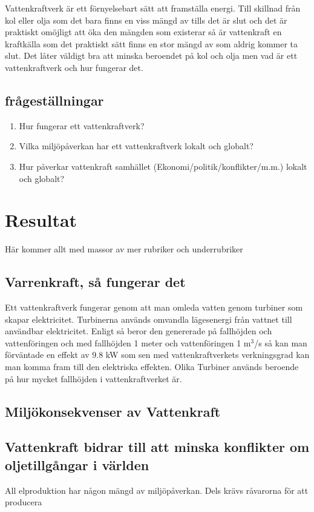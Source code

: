 \documentclass[11p]{article}
\begin{document}
Vattenkraftverk är ett förnyelsebart sätt att framställa energi.
 Till skillnad från kol eller olja som det bara finns en viss mängd av tills det är slut och det är praktiskt omöjligt att öka den mängden som existerar så är vattenkraft en kraftkälla som det praktiskt sätt finns en stor mängd av som aldrig kommer ta slut.
Det låter väldigt bra att minska beroendet på kol och olja men vad är ett vattenkraftverk och hur fungerar det.

 \subsection{frågeställningar}
 \begin{enumerate}
  \item Hur fungerar ett vattenkraftverk?
  \item Vilka miljöpåverkan har ett vattenkraftverk lokalt och globalt?
  \item Hur påverkar vattenkraft samhället (Ekonomi/politik/konflikter/m.m.) lokalt och globalt?
 \end{enumerate}

 \section{Resultat}
 Här kommer allt med massor av mer rubriker och underrubriker
 \subsection{Varrenkraft, så fungerar det}

 Ett vattenkraftverk fungerar genom att man omleda vatten genom turbiner som skapar elektricitet.
 Turbinerna används omvandla lägesenergi från vattnet till användbar elektricitet.
 Enligt \textcite{NE} så beror den genererade på fallhöjden och vattenföringen och med fallhöjden 1 meter och vattenföringen 1 m${^3}$/s så kan man förväntade en effekt av 9.8 kW som sen med vattenkraftverkets verkningsgrad kan man komma fram till den elektriska effekten.
Olika Turbiner används beroende på hur mycket fallhöjden i vattenkraftverket är.

 \subsection{Miljökonsekvenser av Vattenkraft}

 \subsection{Vattenkraft bidrar till att minska konflikter om oljetillgångar i världen}
 All elproduktion har någon mängd av miljöpåverkan. Dels krävs råvarorna för att producera
\end{document}
